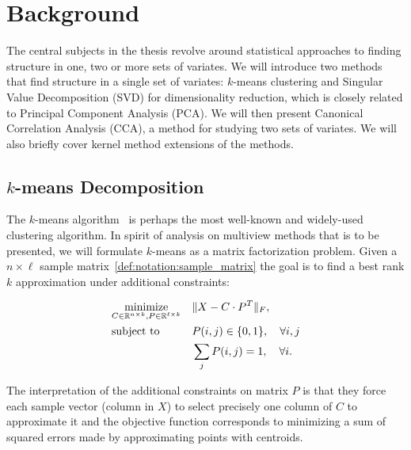 %
\chapter{Background}\label{chap:background}

The central subjects in the thesis revolve around statistical approaches to finding structure in one, two or more sets of variates. We will
introduce two methods that find structure in a single set of variates: $k$-means clustering and Singular Value Decomposition (SVD) for dimensionality reduction, which is closely related to Principal Component Analysis (PCA). We will then present Canonical Correlation Analysis (CCA), a method for studying two sets of variates. We will also briefly cover kernel method extensions of the methods.


\section{$k$-means Decomposition}\label{chap:background:kmeans}

The $k$-means algorithm~\cite{kmeans} is perhaps the most well-known and widely-used clustering algorithm. In spirit of analysis on multiview methods that is to be presented, we will formulate $k$-means as a matrix factorization problem. Given a $n \times \ell$ sample matrix~\ref{def:notation:sample_matrix}
the goal is to find a best rank $k$ approximation under additional constraints:

\begin{equation}\label{eq:background:kmeans:opt}
\begin{aligned}
& \underset{C \in \mathbb{R}^{n \times k}, P \in \mathbb{R}^{\ell \times k}}{\text{minimize}}
& & \lVert X - C \cdot P^T\rVert_F, \\
& \text{subject to}
& & P(i,j) \in \{0,1\}, \quad \forall i,j \\
& & & \sum_j P(i, j) = 1, \quad \forall i.
\end{aligned}
\end{equation}

The interpretation of the additional constraints on matrix $P$ is that they force each sample vector 
(column in $X$) to select precisely one column of $C$ to approximate it and the objective function
corresponds to minimizing a sum of squared errors made by approximating points with centroids.

